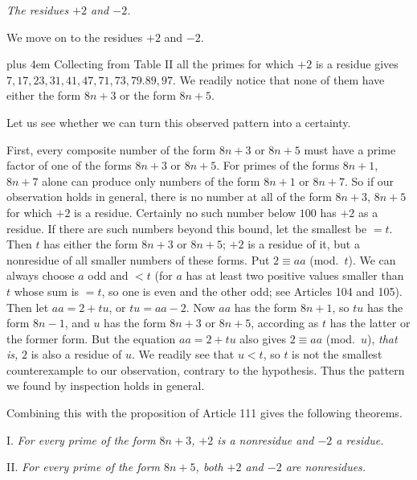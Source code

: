\begin{center}\emph{The residues $+2$ and $-2$.}\end{center}

We move on to the residues $+2$ and $-2$.

{\rightskip=0pt plus 4em
Collecting from Table II all the primes for which $+2$ is a residue gives $7,17,23,31,41,47,71,73,79.89,97$. We readily notice that none of them have either the form $8n+3$ or the form $8n+5$.\par}

Let us see whether we can turn this observed pattern into a certainty.

First, every composite number of the form $8n+3$ or $8n+5$ must have a prime factor of one of the forms $8n+3$ or $8n+5$. For primes of the forms $8n+1$, $8n+7$ alone can produce only numbers of the form $8n+1$ or $8n+7$. So if our observation holds in general, there is no number at all of the form $8n+3$, $8n+5$ for which $+2$ is a residue. Certainly no such number below $100$ has $+2$ as a residue. If there are such numbers beyond this bound, let the smallest be $=t$. Then $t$ has either the form $8n+3$ or $8n+5$; $+2$ is a residue of it, but a nonresidue of all smaller numbers of these forms. Put $2\equiv aa$ (mod.~$t$). We can always choose $a$ odd and $<t$ (for $a$ has at least two positive values smaller than $t$ whose sum is $=t$, so one is even and the other odd; see Articles 104 and 105). Then let $aa=2+tu$, or $tu=aa-2$. Now $aa$ has the form $8n+1$, so $tu$ has the form $8n-1$, and $u$ has the form $8n+3$ or $8n+5$, according as $t$ has the latter or the former form. But the equation $aa=2+tu$ also gives $2\equiv aa$ (mod.~$u$), \emph{that is,} $2$ is also a residue of $u$. We readily see that $u<t$, so $t$ is not the smallest counterexample to our observation, contrary to the hypothesis. Thus the pattern we found by inspection holds in general.

Combining this with the proposition of Article 111 gives the following theorems.

I. \emph{For every prime of the form $8n+3$, $+2$ is a nonresidue and $-2$ a residue.}

II. \emph{For every prime of the form $8n+5$, both $+2$ and $-2$ are nonresidues.}

